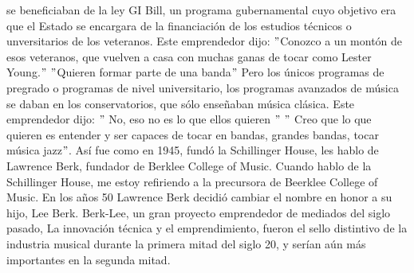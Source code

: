 \documentclass[10pt]{book}
\begin{document}
se beneficiaban de la ley GI Bill, un programa gubernamental cuyo objetivo era que el Estado se encargara de la financiación de los estudios técnicos o unversitarios de los veteranos. Este emprendedor dijo: $"$Conozco a un montón de esos veteranos, que vuelven a casa con muchas ganas  de tocar como Lester Young.$"$  $"$Quieren formar parte de una banda$"$ Pero los únicos programas de pregrado o programas de nivel universitario, los programas avanzados de música se daban en  los conservatorios, que sólo enseñaban música clásica. Este emprendedor dijo:  $"$ No, eso no es lo que ellos quieren $"$ $"$ Creo que lo que quieren es entender y ser capaces de tocar en bandas, grandes bandas, tocar música jazz$"$. Así fue como en 1945, fundó la Schillinger House, les hablo de Lawrence Berk,  fundador de Berklee College of Music. Cuando hablo de la Schillinger House, me estoy refiriendo a la precursora de Beerklee College of Music. En los años 50 Lawrence Berk decidió cambiar el nombre en honor a su hijo, Lee Berk. Berk-Lee, un gran proyecto emprendedor  de mediados del siglo pasado, La innovación técnica y el emprendimiento, fueron el sello distintivo de la industria musical durante la primera mitad del siglo 20, y serían aún más importantes en la segunda mitad.
\end{document}
